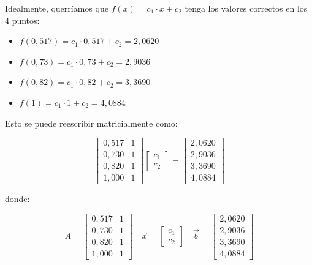 Idealmente, querríamos que $f(x) = c_1 \cdot x  + c_2$ tenga los valores correctos en los 4 puntos:

\begin{center}
\begin{itemize}
    \item \centering $f(0{,}517) = c_1 \cdot 0{,}517 + c_2 = 2{,}0620$
    \item \centering $f(0{,}73) = c_1 \cdot 0{,}73 + c_2 = 2{,}9036$
    \item \centering $f(0{,}82) = c_1 \cdot 0{,}82 + c_2 = 3{,}3690$
    \item \centering $f(1) = c_1 \cdot 1 + c_2 = 4{,}0884$
\end{itemize}
\end{center}

Esto se puede reescribir matricialmente como:

\begin{equation}
    \begin{bmatrix}
        0{,}517 & 1 \\
        0{,}730 & 1 \\
        0{,}820 & 1 \\
        1{,}000 & 1
    \end{bmatrix}
    \begin{bmatrix}
        c_1 \\
        c_2
    \end{bmatrix}
    =
    \begin{bmatrix}
        2{,}0620 \\
        2{,}9036 \\
        3{,}3690 \\
        4{,}0884
    \end{bmatrix}
    \label{eq:cuadrados-minimos-expresion-inicial}
\end{equation}

donde:

\begin{equation}
    A =
    \begin{bmatrix}
        0{,}517 & 1 \\
        0{,}730 & 1 \\
        0{,}820 & 1 \\
        1{,}000 & 1
    \end{bmatrix}
    \quad
    \vec{x} =
    \begin{bmatrix}
        c_1 \\
        c_2
    \end{bmatrix}
    \quad
    \vec{b} =
    \begin{bmatrix}
        2{,}0620 \\
        2{,}9036 \\
        3{,}3690 \\
        4{,}0884
    \end{bmatrix}
    \label{eq:cuadrados-minimos-partes-de-la-expresion-inicial}
\end{equation}


